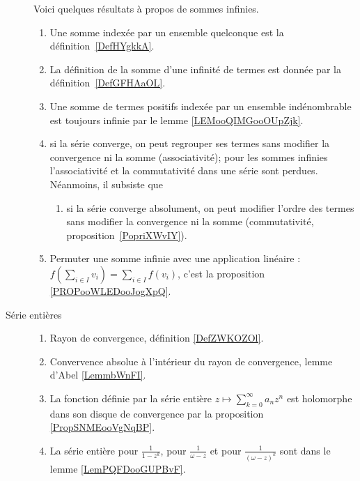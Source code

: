\begin{description}
	      Voici quelques résultats à propos de sommes infinies.%
	      \begin{enumerate}
		      \item
		            Une somme indexée par un ensemble quelconque est la définition~\ref{DefHYgkkA}.
		      \item
		            La définition de la somme d'une infinité de termes est donnée par la définition~\ref{DefGFHAaOL}.
		      \item
		            Une somme de termes positifs indexée par un ensemble indénombrable est toujours infinie par le lemme \ref{LEMooQIMGooOUpZjk}.
		      \item
		            si la série converge, on peut regrouper ses termes sans modifier la convergence ni la somme (associativité);
		            pour les sommes infinies l'associativité et la commutativité dans une série sont perdues. Néanmoins, il subsiste que
		            \begin{enumerate}
			            \item
			                  si la série converge absolument, on peut modifier l'ordre des termes sans modifier la convergence ni la somme (commutativité, proposition~\ref{PopriXWvIY}).
		            \end{enumerate}
		      \item Permuter une somme infinie avec une application linéaire : \( f(\sum_{i\in I}v_i)=\sum_{i\in I}f(v_i)\), c'est la proposition \ref{PROPooWLEDooJogXpQ}.
	      \end{enumerate}
	\item[Série entières]
	      \begin{enumerate}
		      \item
		            Rayon de convergence, définition \ref{DefZWKOZOl}.
		      \item
		            Convervence absolue à l'intérieur du rayon de convergence, lemme d'Abel \ref{LemmbWnFI}.
		      \item
		            La fonction définie par la série entière  \(z\mapsto \sum_{k=0}^{\infty}a_nz^n\) est holomorphe dans son disque de convergence par la proposition \ref{PropSNMEooVgNqBP}.
		      \item
		            La série entière pour \( \frac{1}{ 1-z^k }\), pour \( \frac{1}{ \omega-z }\) et pour \( \frac{1}{ (\omega-z)^k }\) sont dans le lemme \ref{LemPQFDooGUPBvF}.
	      \end{enumerate}
\end{description}
